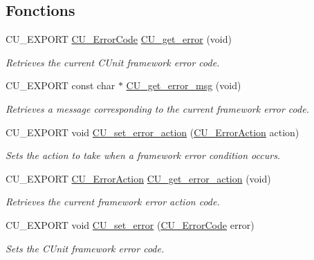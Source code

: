 \subsection*{Fonctions}
\begin{DoxyCompactItemize}
\item 
C\-U\-\_\-\-E\-X\-P\-O\-R\-T \hyperlink{group__Framework_ga743a2a025ee3eb792d7d85f0eea347e6}{C\-U\-\_\-\-Error\-Code} \hyperlink{group__Framework_ga0bf3f9733e5fa0c0ed6ca0a37a2d995e}{C\-U\-\_\-get\-\_\-error} (void)
\begin{DoxyCompactList}\small\item\em Retrieves the current C\-Unit framework error code. \end{DoxyCompactList}\item 
C\-U\-\_\-\-E\-X\-P\-O\-R\-T const char $\ast$ \hyperlink{group__Framework_gaee27bf496da77437288bc9fe2a0b20ed}{C\-U\-\_\-get\-\_\-error\-\_\-msg} (void)
\begin{DoxyCompactList}\small\item\em Retrieves a message corresponding to the current framework error code. \end{DoxyCompactList}\item 
C\-U\-\_\-\-E\-X\-P\-O\-R\-T void \hyperlink{group__Framework_ga58f4bdc1a05802f89005a487768b3d75}{C\-U\-\_\-set\-\_\-error\-\_\-action} (\hyperlink{group__Framework_ga50053b4edbfc96a88027dd57c580ca35}{C\-U\-\_\-\-Error\-Action} action)
\begin{DoxyCompactList}\small\item\em Sets the action to take when a framework error condition occurs. \end{DoxyCompactList}\item 
C\-U\-\_\-\-E\-X\-P\-O\-R\-T \hyperlink{group__Framework_ga50053b4edbfc96a88027dd57c580ca35}{C\-U\-\_\-\-Error\-Action} \hyperlink{group__Framework_gab2e98ce95448aa5a04a4875bc8152d6e}{C\-U\-\_\-get\-\_\-error\-\_\-action} (void)
\begin{DoxyCompactList}\small\item\em Retrieves the current framework error action code. \end{DoxyCompactList}\item 
C\-U\-\_\-\-E\-X\-P\-O\-R\-T void \hyperlink{group__Framework_ga2e817abf46a330a699fe5f472f5bfd64}{C\-U\-\_\-set\-\_\-error} (\hyperlink{group__Framework_ga743a2a025ee3eb792d7d85f0eea347e6}{C\-U\-\_\-\-Error\-Code} error)
\begin{DoxyCompactList}\small\item\em Sets the C\-Unit framework error code. \end{DoxyCompactList}\item 

\end{DoxyCompactItemize}
